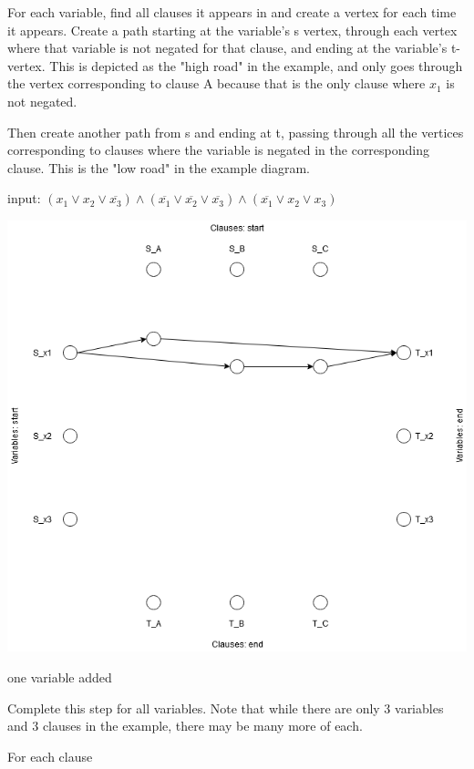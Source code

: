 \documentclass[a4paper]{article}
\begin{document}
For each variable, find all clauses it appears in and create a vertex for each time it appears. Create a path starting at the variable's s vertex, through each vertex where that variable is not negated for that clause, and ending at the variable's t-vertex. This is depicted as the "high road" in the example, and only goes through the vertex corresponding to clause A because that is the only clause where $x_1$ is not negated.

Then create another path from s and ending at t, passing through all the vertices corresponding to clauses where the variable is negated in the corresponding clause. This is the "low road" in the example diagram.

input: $(x_1 \vee x_2 \vee \overline{x_3}) \wedge (\overline{x_1} \vee \overline{x_2} \vee \overline{x_3}) \wedge (\overline{x_1} \vee x_2 \vee x_3)$ 

\begin{center}
    \includegraphics[scale=.5]{hw11-1var.png}
    
    \caption{one variable added}
\end{center}

Complete this step for all variables. Note that while there are only 3 variables and 3 clauses in the example, there may be many more of each.

For each clause
\end{document}
